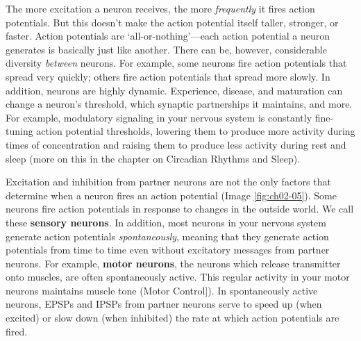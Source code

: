 \documentclass[
]{book}
\begin{document}
The more excitation a neuron receives, the more \emph{frequently} it fires action potentials. But this doesn't make the action potential itself taller, stronger, or faster. Action potentials are `all-or-nothing'---each action potential a neuron generates is basically just like another. There can be, however, considerable diversity \emph{between} neurons. For example, some neurons fire action potentials that spread very quickly; others fire action potentials that spread more slowly. In addition, neurons are highly dynamic. Experience, disease, and maturation can change a neuron's threshold, which synaptic partnerships it maintains, and more. For example, modulatory signaling in your nervous system is constantly fine-tuning action potential thresholds, lowering them to produce more activity during times of concentration and raising them to produce less activity during rest and sleep (more on this in the chapter on Circadian Rhythms and Sleep).

Excitation and inhibition from partner neurons are not the only factors that determine when a neuron fires an action potential (Image \ref{fig:ch02-05}). Some neurons fire action potentials in response to changes in the outside world. We call these \textbf{sensory neurons}. In addition, most neurons in your nervous system generate action potentials \emph{spontaneously}, meaning that they generate action potentials from time to time even without excitatory messages from partner neurons. For example, \textbf{motor neurons}, the neurons which release transmitter onto muscles, are often spontaneously active. This regular activity in your motor neurons maintains muscle tone (Motor Control{]}). In spontaneously active neurons, EPSPs and IPSPs from partner neurons serve to speed up (when excited) or slow down (when inhibited) the rate at which action potentials are fired.
\end{document}
